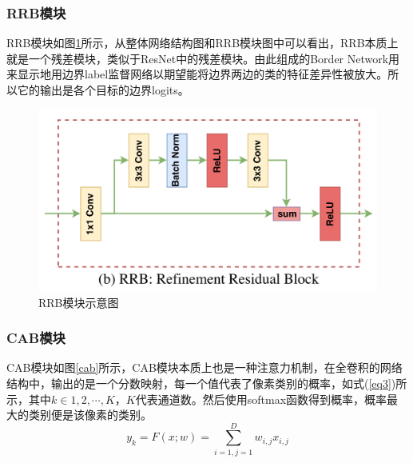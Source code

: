 \documentclass[cn]{elegantbook}
\begin{document}
\subsubsection{RRB模块}
RRB模块如图\ref{rrb}所示，从整体网络结构图和RRB模块图中可以看出，RRB本质上就是一个残差模块，类似于ResNet中的残差模块。由此组成的Border Network用来显示地用边界label监督网络以期望能将边界两边的类的特征差异性被放大。所以它的输出是各个目标的边界logits。
\begin{figure}[!h]
	\centering
	\includegraphics[width=\textwidth]{images/rrb}
	\caption{\label{rrb}RRB模块示意图}
\end{figure}

\subsubsection{CAB模块}
CAB模块如图\ref{cab}所示，CAB模块本质上也是一种注意力机制，在全卷积的网络结构中，输出的是一个分数映射，每一个值代表了像素类别的概率，如式(\ref{eq3})所示，其中$k\in {1,2,\cdots,K}$，$K$代表通道数。然后使用softmax函数得到概率，概率最大的类别便是该像素的类别。
\begin{equation}
\label{eq3}
y_k=F(x;w)=\sum_{i=1,j=1}^{D}w_{i,j}x_{i,j}
\end{equation}
\end{document}
